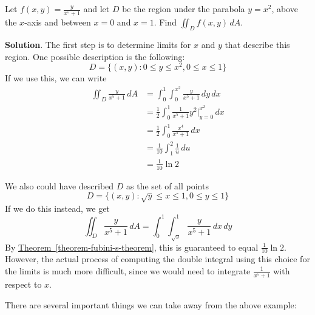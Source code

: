 \documentclass[10pt,]{book}
\theoremstyle{ptxplainnotitle}
\theoremstyle{ptxplaintitle}
\theoremstyle{ptxplainnotitle}
\theoremstyle{ptxplaintitle}
\theoremstyle{ptxplainnotitle}
\theoremstyle{ptxplaintitle}
\theoremstyle{ptxdefinitionnotitle}
\theoremstyle{ptxdefinitiontitle}
\theoremstyle{ptxdefinitionnotitle}
\theoremstyle{ptxdefinitiontitle}
\theoremstyle{ptxdefinitionnotitle}
\theoremstyle{ptxdefinitiontitle}
\theoremstyle{ptxdefinitionnotitle}
\theoremstyle{ptxdefinitiontitle}
\theoremstyle{ptxdefinitionnotitle}
\theoremstyle{ptxdefinitiontitle}
\numberwithin{equation}{section}
\begin{document}
\begin{example}\label{example-integrating-over-a-region-defined-by-a-parabola}
\hypertarget{p-1129}{}%
Let \(f(x,y) = \frac{y}{x^{5}+1}\) and let \(D\) be the region under the parabola \(y = x^{2}\), above the \(x\)-axis and between \(x=0\) and \(x=1\). Find \(\iint_{D}f(x,y)\,dA\).%
\par\smallskip%
\noindent\textbf{Solution}.\hypertarget{solution-179}{}\quad%
\hypertarget{p-1130}{}%
The first step is to determine limits for \(x\) and \(y\) that describe this region. One possible description is the following:%
\begin{equation*}
D = \{(x,y) : 0\leq y\leq x^{2}, 0\leq x\leq 1\}
\end{equation*}
If we use this, we can write%
\begin{align*}
\iint_{D}\frac{y}{x^{5}+1}\,dA & = \int_{0}^{1}\int_{0}^{x^{2}}\frac{y}{x^{5}+1}\,dy\,dx \\
& = \frac{1}{2}\int_{0}^{1}\frac{1}{x^{5}+1}y^{2}\bigg|_{y=0}^{x^{2}}\,dx \\
& = \frac{1}{2}\int_{0}^{1}\frac{x^{4}}{x^{5}+1}\,dx \\
& = \frac{1}{10}\int_{1}^{2}\frac{1}{u}\,du \\
& =  \frac{1}{10}\ln2
\end{align*}
%
\par
\hypertarget{p-1131}{}%
We also could have described \(D\) as the set of all points%
\begin{equation*}
D = \{(x,y) : \sqrt{y} \leq x\leq 1, 0\leq y\leq 1\}
\end{equation*}
If we do this instead, we get%
\begin{equation*}
\iint_{D}\frac{y}{x^{5}+1}\,dA = \int_{0}^{1}\int_{\sqrt{y}}^{1}\frac{y}{x^{5}+1}\,dx\,dy 
\end{equation*}
By \hyperref[theorem-fubini-s-theorem]{Theorem~\ref{theorem-fubini-s-theorem}}, this is guaranteed to equal \(\frac{1}{10}\ln2\). However, the actual process of computing the double integral using this choice for the limits is much more difficult, since we would need to integrate \(\frac{1}{x^{5}+1}\) with respect to \(x\).%
\end{example}
\hypertarget{p-1132}{}%
There are several important things we can take away from the above example: \leavevmode%
\end{document}
